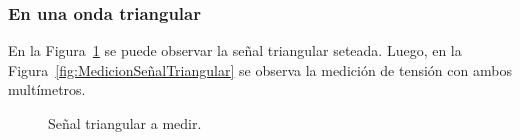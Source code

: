    \subsubsection{En una onda triangular}
      En la Figura~\ref{fig:SeñalTriangular} se puede observar la señal triangular seteada.
      Luego, en la Figura~\ref{fig:MedicionSeñalTriangular} se observa la medición de tensión
      con ambos multímetros.

      \begin{figure}[H]
        \centering
        \caption{Señal triangular a medir.}
        \label{fig:SeñalTriangular}
      \end{figure}

